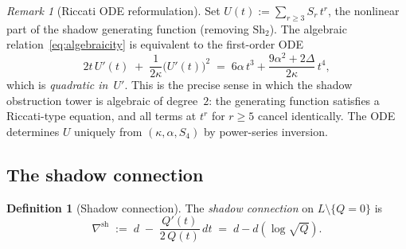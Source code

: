 \documentclass[11pt]{article}
\theoremstyle{plain}
\theoremstyle{definition}
\newtheorem{definition}[theorem]{Definition}
\theoremstyle{remark}
\newtheorem{remark}[theorem]{Remark}
\newcommand{\Sh}{\mathrm{Sh}}
\begin{document}
\begin{remark}[Riccati ODE reformulation]
\label{rem:riccati-ode}
Set $U(t) := \sum_{r \geq 3} S_r\,t^r$, the nonlinear part
of the shadow generating function (removing $\Sh_2$).
The algebraic relation~\eqref{eq:algebraicity} is equivalent
to the first-order ODE
\begin{equation}\label{eq:riccati-ode}
 2t\,U'(t) \;+\; \frac{1}{2\kappa}\bigl(U'(t)\bigr)^2
 \;=\; 6\alpha\,t^3
 + \frac{9\alpha^2 + 2\Delta}{2\kappa}\,t^4,
\end{equation}
which is \emph{quadratic in~$U'$}. This is the precise sense
in which the shadow obstruction tower is algebraic of degree~$2$: the
generating function satisfies a Riccati-type equation,
and all terms at $t^r$ for $r \geq 5$ cancel identically.
The ODE determines $U$ uniquely from $(\kappa, \alpha, S_4)$
by power-series inversion.
\end{remark}


\subsection{The shadow connection}

\begin{definition}[Shadow connection]
\label{def:shadow-conn}
The \emph{shadow connection} on $L \setminus \{Q = 0\}$ is
\begin{equation}\label{eq:shadow-conn}
 \nabla^{\mathrm{sh}}
 \;:=\; d \;-\; \frac{Q'(t)}{2\,Q(t)}\,dt
 \;=\; d - d\!\left(\log\sqrt{Q}\right).
\end{equation}
\end{definition}
\end{document}
